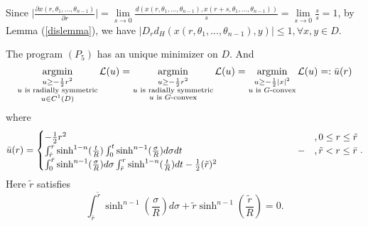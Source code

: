 \begin{proposition}\label{disprop}
	Since  $\Big|\frac{\partial x(r, \theta_1,...,\theta_{n-1})}{\partial r}\Big|= \lim\limits_{s\rightarrow 0}\frac{d( x(r, \theta_1,...,\theta_{n-1}),  x(r+s, \theta_1,...,\theta_{n-1}))}{s}=\lim\limits_{s\rightarrow 0}\frac{s}{s} = 1$,
	by Lemma (\ref{dislemma}), we have $ |D_r d_H(x(r, \theta_1,...,\theta_{n-1}), y)|\le 1, \forall x, y \in D.$
\end{proposition}
\begin{theorem}
	The program $(P_5)$ has an unique minimizer on $D$. And 
	\begin{equation*}
	\argmin\limits_{\substack{u\ge -\frac{1}{2}r^2 \\ u \text{ is radially symmetric} \\ u \in C^1(D)}} \mathcal{L}(u)= \argmin\limits_{\substack{u\ge -\frac{1}{2}r^2 \\ u \text{ is radially symmetric} \\ u \text{ is $G$-convex}}} \mathcal{L}(u)=\argmin\limits_{\substack{u\ge -\frac{1}{2}|x|^2 \\ u \text{ is $G$-convex}}} \mathcal{L}(u) =: \bar{u}(r)
	\end{equation*}
	where
	\begin{equation*}
	\bar{u}(r) = 
	\begin{cases}
	-\frac{1}{2} r^2 & ,0\le r\le \tilde{r} \\
	\parbox[t]{.8\textwidth}{$\int_{\tilde{r}}^{r}\sinh^{1-n}(\frac{t}{R})\int_{0}^{t}\sinh^{n-1}(\frac{\sigma}{R})d\sigma dt - \int_{0}^{\bar{r}}\sinh^{n-1}(\frac{\sigma }{R})d \sigma  \int_{\tilde{r}}^{r}\sinh^{1-n}(\frac{t}{R}) d t -\frac{1}{2}(\tilde{r})^2 $} & ,\tilde{r} < r \le \bar{r} \\
	\end{cases}.
	\end{equation*}
	Here $\tilde{r}$ satisfies 
	\begin{equation*}
	\int_{\bar{r}}^{\tilde{r}}\sinh^{n-1}(\frac{\sigma }{R}) d\sigma  +\tilde{r}\sinh^{n-1}(\frac{\tilde{r}}{R})=0.
	\end{equation*}
\end{theorem}

